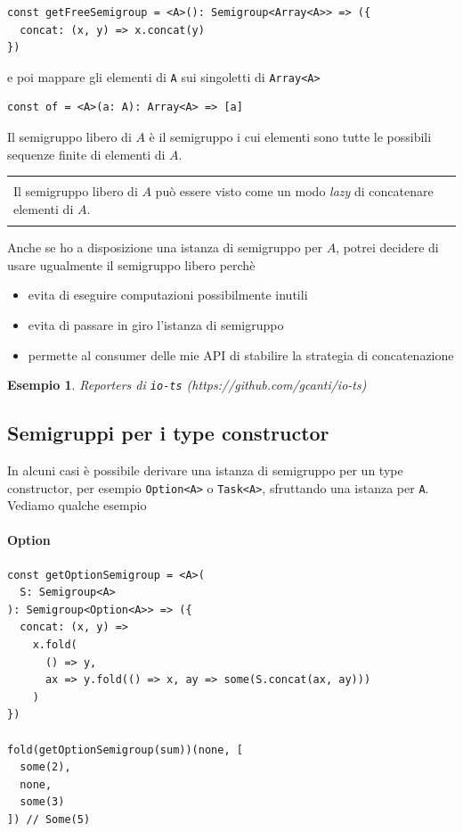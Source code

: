 \documentclass[12pt]{article}
\newtheorem{example}{Esempio}[section]
\newenvironment{demo}
    {\begin{center}
    \begin{tabular}{|p{0.9\textwidth}|}
    \hline\\
    }
    {
    \\\\\hline
    \end{tabular}
    \end{center}
    }
\begin{document}
\begin{verbatim}
const getFreeSemigroup = <A>(): Semigroup<Array<A>> => ({
  concat: (x, y) => x.concat(y)
})
\end{verbatim}

e poi mappare gli elementi di \texttt{A} sui singoletti di \texttt{Array<A>}

\begin{verbatim}
const of = <A>(a: A): Array<A> => [a]
\end{verbatim}

Il semigruppo libero di $A$ è il semigruppo i cui elementi sono tutte le possibili sequenze finite di elementi di $A$.

\begin{demo}
Il semigruppo libero di $A$ può essere visto come un modo \emph{lazy} di concatenare elementi di $A$.
\end{demo}

Anche se ho a disposizione una istanza di semigruppo per $A$, potrei decidere di usare ugualmente il semigruppo libero perchè

\begin{itemize}
  \item evita di eseguire computazioni possibilmente inutili
  \item evita di passare in giro l'istanza di semigruppo
  \item permette al consumer delle mie API di stabilire la strategia di concatenazione
\end{itemize}

\begin{example}
Reporters di \texttt{io-ts} (https://github.com/gcanti/io-ts)
\end{example}

\subsection{Semigruppi per i type constructor}

In alcuni casi è possibile derivare una istanza di semigruppo per un type constructor, per esempio \texttt{Option<A>} o \texttt{Task<A>},
sfruttando una istanza per \texttt{A}. Vediamo qualche esempio

\paragraph{Option}

\begin{verbatim}
const getOptionSemigroup = <A>(
  S: Semigroup<A>
): Semigroup<Option<A>> => ({
  concat: (x, y) =>
    x.fold(
      () => y,
      ax => y.fold(() => x, ay => some(S.concat(ax, ay)))
    )
})

fold(getOptionSemigroup(sum))(none, [
  some(2),
  none,
  some(3)
]) // Some(5)
\end{verbatim}
\end{document}
